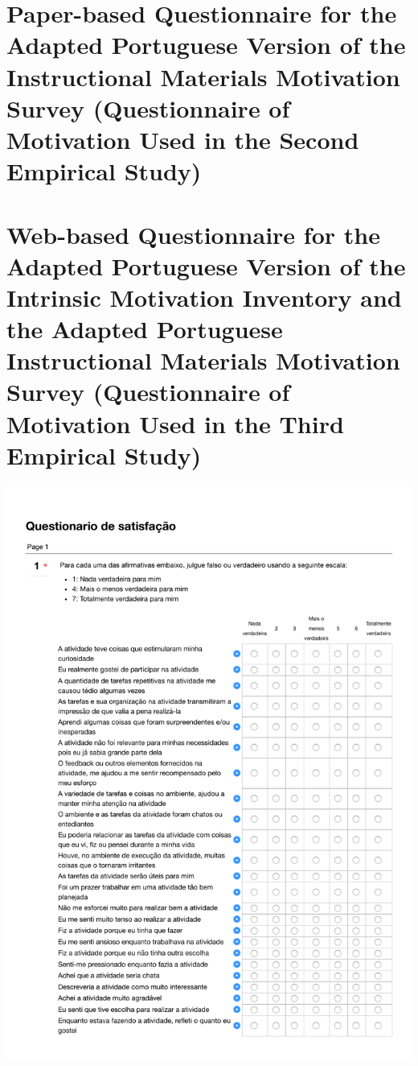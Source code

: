 \chapter[Paper-based Questionnaire for the Adapted Portuguese IMMS]{Paper-based Questionnaire for the Adapted Portuguese Version of the Instructional Materials Motivation Survey (Questionnaire of Motivation Used in the Second Empirical Study)}
\label{annex:IMMS-second-study}

\chapter[Web-based Questionnaire for the Adapted Portuguese Version of IMI and IMMS]{Web-based Questionnaire for the Adapted Portuguese Version of the Intrinsic Motivation Inventory and the Adapted Portuguese Instructional Materials Motivation Survey (Questionnaire of Motivation Used in the Third Empirical Study)}
\label{annex:IMI-IMMS-third-study}
\includegraphics[width=1\textwidth]{images/annex/IMI-IMMS-third-study-01.pdf}
